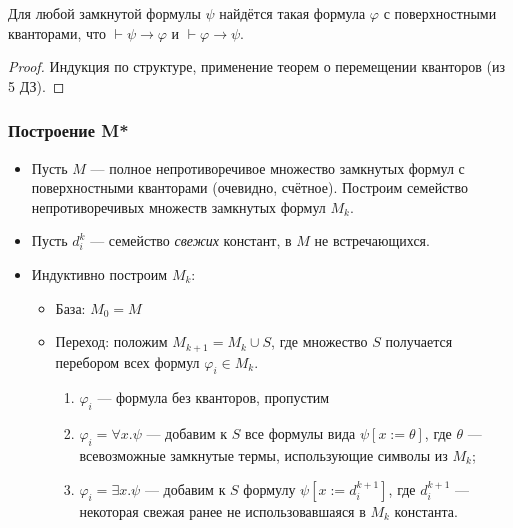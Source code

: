 \begin{theorem}
    Для любой замкнутой формулы $\psi$ найдётся такая формула $\varphi$ с поверхностными кванторами,
что $\vdash \psi\to\varphi$ и $\vdash\varphi\to\psi$.
\end{theorem}
\begin{proof}Индукция по структуре, применение теорем о перемещении кванторов (из 5 ДЗ).
\end{proof}

\subsubsection{Построение M*}
\begin{itemize}
\item Пусть $M$ --- полное непротиворечивое множество замкнутых формул с поверхностными кванторами (очевидно, счётное).
 Построим семейство непротиворечивых множеств замкнутых формул $M_k$.
\item Пусть $d^k_i$ --- семейство \emph{свежих} констант, в $M$ не встречающихся.
\item Индуктивно построим $M_k$:
\begin{itemize}
\item База: $M_0 = M$
\item Переход: положим $M_{k+1} = M_k \cup S$, где множество $S$ получается перебором всех формул $\varphi_i \in M_k$.
\begin{enumerate}
\item $\varphi_i$ --- формула без кванторов, пропустим
\item $\varphi_i = \forall x.\psi$ --- добавим к $S$ все формулы вида $\psi [x := \theta]$, где
$\theta$ --- всевозможные замкнутые термы, использующие символы из $M_k$;
\item $\varphi_i = \exists x.\psi$ --- добавим к $S$ формулу $\psi [x := d^{k+1}_i]$, где $d^{k+1}_i$ --- некоторая
свежая ранее не использовавшаяся в $M_k$ константа.
\end{enumerate}
\end{itemize}
\end{itemize}

